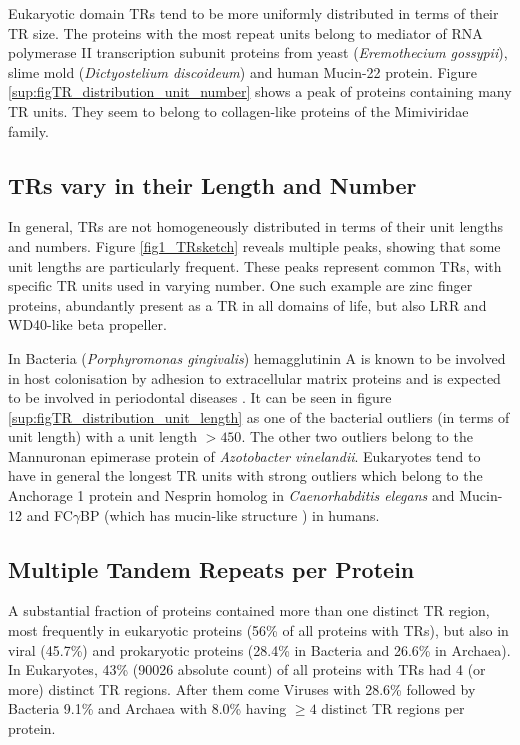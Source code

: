 \documentclass[a4,center,fleqn]{NAR}
\begin{document}
Eukaryotic domain TRs tend to be more uniformly distributed in terms of their TR size. The proteins with the most repeat units belong to mediator of RNA polymerase II transcription subunit proteins from yeast (\textit{{Eremothecium gossypii}}), slime mold (\textit{{Dictyostelium discoideum}}) and human Mucin-22 protein.
Figure \ref{sup:figTR_distribution_unit_number} shows a peak of proteins containing many TR units. They seem to belong to collagen-like proteins of the Mimiviridae family.

\subsection{TRs vary in their Length and Number}
In general, TRs are not homogeneously distributed in terms of their unit lengths and numbers. Figure \ref{fig1_TRsketch} reveals multiple peaks, showing that some unit lengths are particularly frequent. These peaks represent common TRs, with specific TR units used in varying number.  
One such example are zinc finger proteins, abundantly present as a TR in all domains of life, but also LRR and WD40-like beta propeller.

In Bacteria (\textit{Porphyromonas gingivalis}) hemagglutinin A is known to be involved in host colonisation by adhesion to extracellular matrix proteins and is expected to be involved in periodontal diseases \cite{Nelson2003, Han1996}. 
It can be seen in figure \ref{sup:figTR_distribution_unit_length} as one of the bacterial outliers (in terms of unit length) with a unit length $>450$. The other two outliers belong to the Mannuronan epimerase protein of \textit{Azotobacter vinelandii}.
Eukaryotes tend to have in general the longest TR units with strong outliers which belong to the Anchorage 1 protein and Nesprin homolog in \textit{Caenorhabditis elegans} and Mucin-12 
and FC$\gamma$BP (which has mucin-like structure \cite{Harada1997}) in humans. 

\subsection{Multiple Tandem Repeats per Protein}
A substantial fraction of proteins contained more than one distinct TR region, most frequently in eukaryotic proteins (56\% of all proteins with TRs), but also in viral (45.7\%) and prokaryotic proteins (28.4\% in Bacteria and 26.6\% in Archaea). 
In Eukaryotes, 43\% (90026 absolute count) of all proteins with TRs had 4 (or more) distinct TR regions. After them come Viruses with 28.6\% followed by Bacteria 9.1\% and Archaea with 8.0\% having $\geq 4$ distinct TR regions per protein.
\end{document}
